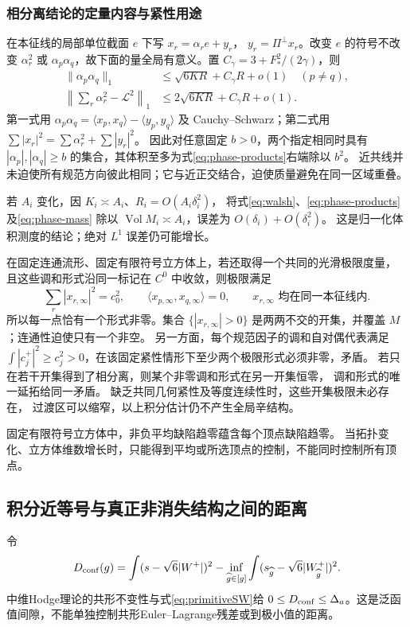\documentclass[UTF8,a4paper,11pt,fontset=fandol]{ctexart}
\numberwithin{equation}{section}
\theoremstyle{definition}
\newcommand{\Vol}{\operatorname{Vol}}
\begin{document}
\subsubsection{相分离结论的定量内容与紧性用途}\label{sec:walsh-phases}
在本征线的局部单位截面 $e$ 下写 $x_r=\alpha_re+y_r$，
$y_r=\Pi^\perp x_r$。改变 $e$ 的符号不改变 $\alpha_r^2$ 或
$\alpha_p\alpha_q$，故下面的量全局有意义。置
$C_\gamma=3+F_*^2/(2\gamma)$，则
\begin{align}
\|\alpha_p\alpha_q\|_1
&\le\sqrt{6KR}+C_\gamma R+o(1)\quad(p\ne q),\label{eq:phase-products}\\
\left\|\sum_r\alpha_r^2-\mathcal L^2\right\|_1
&\le2\sqrt{6KR}+C_\gamma R+o(1).\label{eq:phase-mass}
\end{align}
第一式用
$\alpha_p\alpha_q=\langle x_p,x_q\rangle-\langle y_p,y_q\rangle$
及 Cauchy--Schwarz；第二式用
$\sum|x_r|^2=\sum\alpha_r^2+\sum|y_r|^2$。
因此对任意固定 $b>0$，两个指定相同时具有 $|\alpha_p|,|\alpha_q|\ge b$
的集合，其体积至多为式\eqref{eq:phase-products}右端除以 $b^2$。
近共线并未迫使所有规范方向彼此相同；它与近正交结合，迫使质量避免在同一区域重叠。

若 $A_i$ 变化，因 $K_i\asymp A_i$、$R_i=O(A_i\delta_i^2)$，
将式\eqref{eq:walsh}、\eqref{eq:phase-products}及\eqref{eq:phase-mass}
除以 $\Vol M_i\asymp A_i$，误差为 $O(\delta_i)+O(\delta_i^2)$。
这是归一化体积测度的结论；绝对 $L^1$ 误差仍可能增长。

在固定连通流形、固定有限符号立方体上，若还取得一个共同的光滑极限度量，
且这些调和形式沿同一标记在 $C^0$ 中收敛，则极限满足
\[
\sum_r|x_{r,\infty}|^2=c_0^2,\qquad
\langle x_{p,\infty},x_{q,\infty}\rangle=0,
\qquad x_{r,\infty}\text{ 均在同一本征线内}.
\]
所以每一点恰有一个形式非零。集合
$\{|x_{r,\infty}|>0\}$ 是两两不交的开集，并覆盖 $M$；连通性迫使只有一个非空。
另一方面，每个规范因子的调和自对偶代表满足
$\int|c_j^+|^2\ge c_j^2>0$，在该固定紧性情形下至少两个极限形式必须非零，矛盾。
若只在若干开集得到了相分离，则某个非零调和形式在另一开集恒零，
调和形式的唯一延拓给同一矛盾。
缺乏共同几何紧性及等度连续性时，这些开集极限未必存在，
过渡区可以缩窄，以上积分估计仍不产生全局辛结构。

固定有限符号立方体中，非负平均缺陷趋零蕴含每个顶点缺陷趋零。
当拓扑变化、立方体维数增长时，只能得到平均或所选顶点的控制，不能同时控制所有顶点。

\subsection{积分近等号与真正非消失结构之间的距离}
令
\[
D_{\rm conf}(g)=\int(s-\sqrt6|W^+|)^2
-\inf_{\widehat g\in[g]}\int(s_{\widehat g}-\sqrt6|W^+_{\widehat g}|)^2.
\]
中维Hodge理论的共形不变性与式\eqref{eq:primitiveSW}给
$0\le D_{\rm conf}\le\Delta_a$。这是泛函值间隙，不能单独控制共形Euler--Lagrange残差或到极小值的距离。
\end{document}

